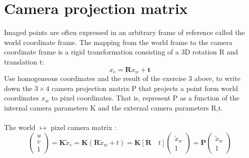 \documentclass[a4paper,12pt]{article}
\begin{document}
\section{ Camera projection matrix}
Imaged points are often expressed in an arbitrary frame of reference called the world coordinate frame. The mapping from the world frame to the camera coordinate frame is a rigid transformation consisting of a 3D rotation R and translation t: $$x_c = \mathbf{R}x_w + \mathbf{t}$$ Use homogeneous coordinates and the result of the exercise 3 above, to write down the $3 \times 4$ camera projection matrix P that projects a point form world coordinates $x_w$ to pixel coordinates. That is, represent P as a function of the internal camera parameters K and the external camera parameters R,t.\\\\
The world $\mapsto$ pixel camera matrix :
$$\begin{pmatrix}
u\\v\\1
\end{pmatrix} = \mathbf{K}\tilde{x}_c = \mathbf{K}(\mathbf{R}\tilde{x}_w + t) = \mathbf{K}[\mathbf{R} \quad t]
\begin{pmatrix}
\tilde{x}_w\\1
\end{pmatrix} = \mathbf{P} 
\begin{pmatrix}
\tilde{x}_w\\1
\end{pmatrix}
$$ 
\end{document}
